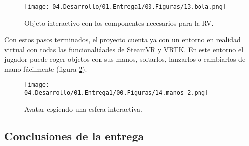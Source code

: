 \begin{figure}
  \centering
    \texttt{[image: 04.Desarrollo/01.Entrega1/00.Figuras/13.bola.png]}
    \caption{Objeto interactivo con los componentes necesarios para la RV.}
    \label{fig:interactable}
\end{figure}

Con estos pasos terminados, el proyecto cuenta ya con un entorno en realidad virtual con todas las funcionalidades de SteamVR y VRTK. En este entorno el jugador puede coger objetos con sus manos, soltarlos, lanzarlos o cambiarlos de mano fácilmente (figura \ref{fig:esferaCogida}).


\begin{figure}
  \centering
    \texttt{[image: 04.Desarrollo/01.Entrega1/00.Figuras/14.manos\_2.png]}
    \caption{Avatar cogiendo una esfera interactiva.}
    \label{fig:esferaCogida}
\end{figure}




\subsection{Conclusiones de la entrega}











